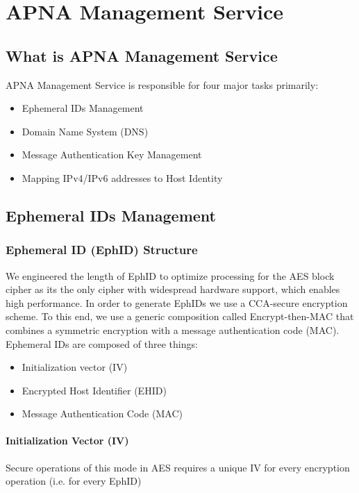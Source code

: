 
\chapter{APNA Management Service} %

\label{apnams} %

\section{What is APNA Management Service}
APNA Management Service is responsible for four major tasks primarily:

\begin{itemize}
    \item Ephemeral IDs Management
    \item Domain Name System (DNS)
    \item Message Authentication Key Management
    \item Mapping IPv4/IPv6 addresses to Host Identity
\end{itemize}

\section{Ephemeral IDs Management}
\subsection{Ephemeral ID (EphID) Structure}
We engineered the length of EphID to optimize processing for the AES block cipher as its the only cipher with widespread hardware support, which enables high performance. In order to generate EphIDs we use a CCA-secure encryption scheme. To this end, we use a generic composition called Encrypt-then-MAC that combines a symmetric encryption with a message authentication code (MAC).
Ephemeral IDs are composed of three things:
\begin{itemize}
    \item Initialization vector (IV)
    \item Encrypted Host Identifier (EHID)
    \item Message Authentication Code (MAC)
\end{itemize}

\subsubsection{Initialization Vector (IV)}
Secure operations of this mode in AES requires a unique IV for every encryption operation (i.e. for every EphID)

